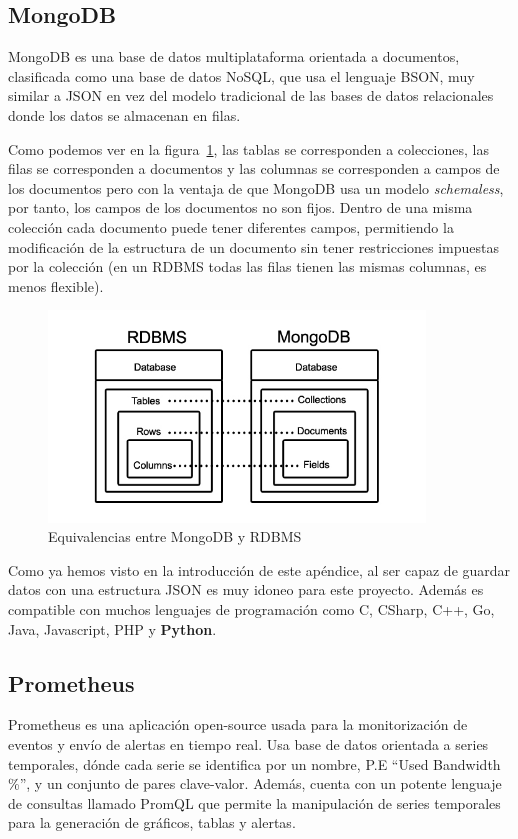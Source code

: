 \subsection{MongoDB}
MongoDB es una base de datos multiplataforma orientada a documentos, clasificada como una base de 
datos NoSQL, que usa el lenguaje BSON, muy similar a JSON en vez del modelo tradicional de las 
bases de datos relacionales donde los datos se almacenan en filas. 

Como podemos ver en la figura~\ref{fig:Mongo_vs_RDBMS}, las tablas se corresponden a colecciones,
las filas se corresponden a documentos y las columnas se corresponden a campos de los documentos
pero con la ventaja de que MongoDB usa un modelo \textit{schemaless}, por tanto, los campos de los
documentos no son fijos. Dentro de una misma colección cada documento puede tener diferentes campos,
permitiendo la modificación de la estructura de un documento sin tener restricciones impuestas por
la colección (en un RDBMS todas las filas tienen las mismas columnas, es menos flexible). 


\begin{figure}
    \centering
    \includegraphics[width=10cm]{graphics/MongoDB_vs_RMSBD}
    \caption{Equivalencias entre MongoDB y RDBMS}
    \label{fig:Mongo_vs_RDBMS}
\end{figure}

Como ya hemos visto en la introducción de este apéndice, al ser capaz de guardar datos con una
estructura \gls{JSON} es muy idoneo para este proyecto. Además es compatible con muchos lenguajes de
programación como C, CSharp, C++, Go, Java, Javascript, PHP y \textbf{Python}.
\subsection{Prometheus}
Prometheus \cite{prometheus} es una aplicación open-source usada para la monitorización de 
eventos y envío de alertas en tiempo real. Usa base de datos orientada a series temporales, 
dónde cada serie se identifica por un nombre, P.E \enquote{Used Bandwidth \%}, y un conjunto 
de pares clave-valor. Además, cuenta con un potente lenguaje de consultas llamado PromQL que
permite la manipulación de series temporales para la generación de gráficos, tablas y alertas.

